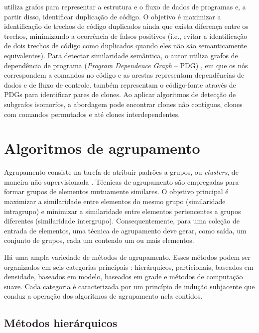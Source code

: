  utiliza grafos para representar a estrutura e o fluxo de dados de programas e, a partir disso, identificar duplicação de código. O objetivo é maximizar a identificação de trechos de código duplicados ainda que exista diferença entre os trechos, minimizando a ocorrência de falsos positivos (i.e., evitar a identificação de dois trechos de código como duplicados quando eles não são semanticamente equivalentes). Para detectar similaridade semântica, o autor utiliza grafos de dependência de programa (\textit{Program Dependence Graph} -- PDG) \cite{ferrante:etal:1987}, em que os nós correspondem a comandos no código e as arestas representam dependências de dados e de fluxo de controle.  também representam o código-fonte através de PDGs para identificar pares de clones. Ao aplicar algoritmos de detecção de subgrafos isomorfos, a abordagem pode encontrar clones não contíguos, clones com comandos permutados e até clones interdependentes.

\section{Algoritmos de agrupamento}

Agrupamento consiste na tarefa de atribuir padrões a grupos, ou \textit{clusters}, de maneira não supervisionada \cite{jain:etal:1999}. Técnicas de agrupamento são empregadas para formar grupos de elementos mutuamente similares. O objetivo principal é maximizar a similaridade entre elementos do mesmo grupo (similaridade intragrupo) e minimizar a similaridade entre elementos pertencentes a grupos diferentes (similaridade intergrupo). Consequentemente, para uma coleção de entrada de elementos, uma técnica de agrupamento deve gerar, como saída, um conjunto de grupos, cada um contendo um ou mais elementos.

Há uma ampla variedade de métodos de agrupamento. Esses métodos podem ser organizados em seis categorias principais \cite{rokach:etal:2005}: hierárquicos, particionais, baseados em densidade, baseados em modelo, baseados em grade e métodos de computação suave. Cada categoria é caracterizada por um princípio de indução subjacente que conduz a operação dos algoritmos de agrupamento nela contidos.

\subsection{Métodos hierárquicos}

